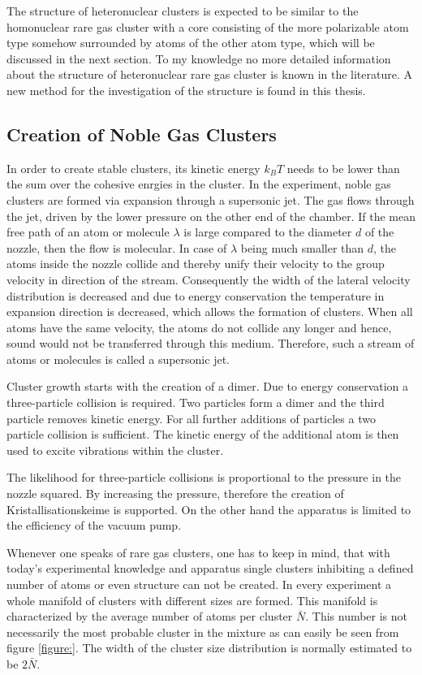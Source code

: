The structure of heteronuclear clusters is expected to be similar to the
homonuclear rare gas cluster with a core consisting of the more polarizable
atom type somehow surrounded by atoms of the other atom type, which will be discussed
in the next section. To my knowledge no more detailed information about
the structure of heteronuclear rare gas cluster is known in the
literature. A new method for the investigation of the structure is found
in this thesis.


\subsection{Creation of Noble Gas Clusters}
In order to create stable clusters, its kinetic energy $k_BT$ needs to be lower
than the sum over the cohesive enrgies in the cluster.
In the experiment, noble gas clusters are formed via expansion through
a supersonic jet. The gas flows through the jet, driven by the lower pressure
on the other end of the chamber. If the mean free path of an atom or molecule
$\lambda$ is large compared to the diameter $d$ of the nozzle, then the flow is
molecular. In case of $\lambda$ being much smaller than $d$, the atoms inside
the nozzle collide and thereby unify their velocity to the group velocity
in direction of the stream. Consequently the width of the lateral velocity
distribution is decreased and due to energy conservation the temperature
in expansion direction is decreased, which allows the formation of clusters.
When all atoms have the same velocity, the atoms do not collide any longer
and hence, sound would not be transferred through this medium. Therefore,
such a stream of atoms or molecules is called a supersonic jet.

Cluster growth starts with the creation of a dimer. Due to energy conservation
a three-particle collision is required. Two particles form a dimer and the
third particle removes kinetic energy. For all further additions of particles
a two particle collision is sufficient. The kinetic energy of the additional
atom is then used to excite vibrations within the cluster.

The likelihood for three-particle collisions is proportional to the pressure
in the nozzle squared. By increasing the pressure, therefore the creation
of Kristallisationskeime is supported. On the other hand the apparatus
is limited to the efficiency of the vacuum pump.

Whenever one speaks of rare gas clusters, one has to keep in mind, that
with today's experimental knowledge and apparatus single clusters
inhibiting a defined number of atoms or even structure can not be created.
In every experiment a whole manifold of clusters with different sizes are
formed. This manifold is characterized by the average number of atoms
per cluster $\bar{N}$. This number is not necessarily the most probable
cluster in the mixture as can easily be seen from figure \ref{figure:}.
The width of the cluster size distribution is normally estimated to be
$2\bar{N}$.

